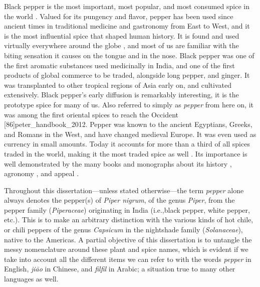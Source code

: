 Black pepper is the most important, most popular, and most consumed spice in the world \autocite[721]{mabberley_mabberleys_2017}. Valued for its pungency and flavor, pepper has been used since ancient times in traditional medicine and gastronomy from East to West, and it is the most influential spice that shaped human history. It is found and used virtually everywhere around the globe \autocite[253]{hill_contemporary_2004}, and most of us are familiar with the biting sensation it causes on the tongue and in the nose. Black pepper was one of the first aromatic substances used medicinally in India, and one of the first products of global commerce to be traded, alongside long pepper, and ginger. It was transplanted to other tropical regions of Asia early on, and cultivated extensively. Black pepper's early diffusion is remarkably interesting, it is the prototype spice for many of us. Also referred to simply as \textit{pepper} from here on, it was among the first oriental spices to reach the Occident [86]{peter_handbook_2012}. Pepper was known to the ancient Egyptians, Greeks, and Romans in the West, and have changed medieval Europe. It was even used as currency in small amounts. Today it accounts for more than a third of all spices traded in the world, making it the most traded spice as well \autocite{ravindran_piper_2017}. Its importance is well demonstrated by the many books and monographs about its history \autocite[see][]{shaffer_pepper_2013,wernick_pepper_2014}, agronomy \autocite[see][]{ravindran_black_2000,nair_geography_2020}, and appeal \autocite[see][]{de_kerros_pepper_2016,barth_pepper_2019}.

\begin{note}
    Throughout this dissertation---unless stated otherwise---the term \textit{pepper} alone always denotes the pepper(s) of \textit{Piper nigrum}, of the genus \textit{Piper}, from the pepper family (\textit{Piperaceae}) originating in India (i.e.,black pepper, white pepper, etc.). This is to make an arbitrary distinction with the various kinds of hot chile, or chili peppers of the genus \textit{Capsicum} in the nightshade family (\textit{Solanaceae}), native to the Americas. A partial objective of this dissertation is to untangle the messy nomenclature around these plant and spice names, which is evident if we take into account all the different items we can refer to with the words \textit{pepper} in English, \textit{jiāo} in Chinese, and \textit{filfil} in Arabic; a situation true to many other languages as well. 
    \end{note}

